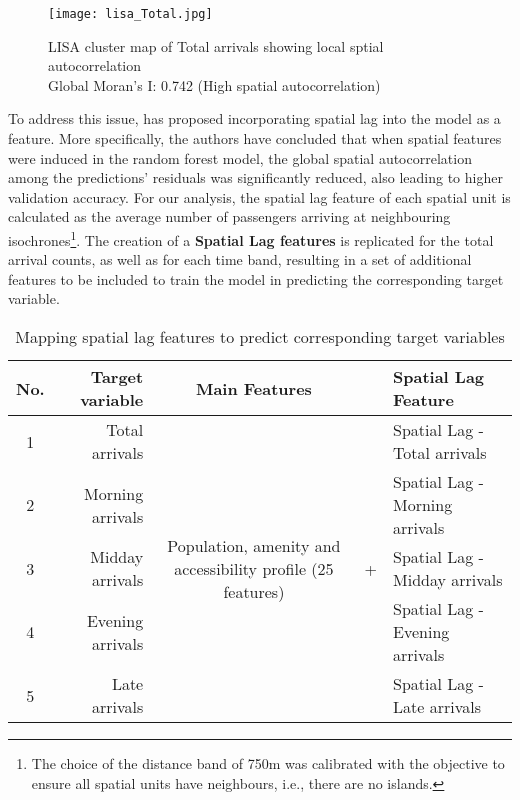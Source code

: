 \begin{figure}[ht]
    \centering
    \texttt{[image: lisa\_Total.jpg]}
    \captionsetup{justification=centering}
    \caption{LISA cluster map of Total arrivals showing local sptial autocorrelation\\Global Moran's I: 0.742 (High spatial autocorrelation)}
    \label{fig:lisacluster}
\end{figure}

To address this issue, \citet{liuIncorporatingSpatialAutocorrelation2022} has proposed incorporating spatial lag into the model as a feature. More specifically, the authors have concluded that when spatial features were induced in the random forest model, the global spatial autocorrelation among the predictions' residuals was significantly reduced, also leading to higher validation accuracy. For our analysis, the spatial lag feature of each spatial unit is calculated as the average number of passengers arriving at neighbouring isochrones\footnote{The choice of the distance band of 750m was calibrated with the objective to ensure all spatial units have neighbours, i.e., there are no islands.}. The creation of a \textbf{Spatial Lag features} is replicated for the total arrival counts, as well as for each time band, resulting in a set of additional features to be included to train the model in predicting the corresponding target variable.

\begin{table}[ht]
    \centering
    \renewcommand{\arraystretch}{1.5}
    \begin{tabular}{|c r || c c l|}
        \hline
        \rowcolor{lightgray}
        \textbf{No.} & \textbf{Target variable} & \textbf{Main Features} & &\textbf{Spatial Lag Feature}\\
        
        \hline
        1 & Total arrivals  &  \multirow{5}{10em}{Population, amenity and accessibility profile (25 features)} 
                                &  \multirow{5}{*}{+}       &   Spatial Lag - Total arrivals    \\ 
        2 & Morning arrivals    &                       &   &   Spatial Lag - Morning arrivals  \\ 
        3 & Midday arrivals     &                       &   &   Spatial Lag - Midday arrivals   \\ 
        4 & Evening arrivals    &                       &   &   Spatial Lag - Evening arrivals  \\ 
        5 & Late arrivals       &                       &   &   Spatial Lag - Late arrivals     \\
        \hline
    \end{tabular}
    \caption{Mapping spatial lag features to predict corresponding target variables}
    \label{tab:spatiallag}
\end{table}


